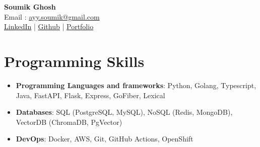 \documentclass[letterpaper,11pt]{article}
\newcommand{\resumeItem}[2]{\item\small{\textbf{#1}{ #2 \vspace{-2pt}}}}
\newcommand{\resumeSubItem}[2]{\resumeItem{#1}{#2}\vspace{-4pt}}
\newcommand{\resumeSubHeadingListStart}{\begin{itemize}[leftmargin=*]}
\newcommand{\resumeSubHeadingListEnd}{\end{itemize}}
\begin{document}
\begin{center}
  \textbf{\Huge Soumik Ghosh} \\
  Email : \href{mailto:ayy.soumik@gmail.com}{ayy.soumik@gmail.com} \\
  \href{https://www.linkedin.com/in/soumik-gh0sh/}{LinkedIn} |
  \href{https://github.com/araon/}{Github} |
  \href{https://araon.space/}{Portfolio}
\end{center}

\section{Programming Skills}
\resumeSubHeadingListStart
\resumeSubItem{}{\textbf{Programming Languages and frameworks}{: Python, Golang, Typescript, Java, FastAPI, Flask, Express, GoFiber, Lexical}}
\resumeSubItem{}{\textbf{Databases}{: SQL (PostgreSQL, MySQL), NoSQL (Redis, MongoDB), VectorDB (ChromaDB, PgVector)}}
\resumeSubItem{}{\textbf{DevOps}{: Docker, AWS, Git, GitHub Actions, OpenShift}}
\resumeSubHeadingListEnd
\end{document}
